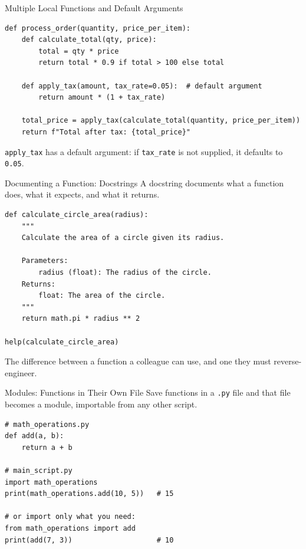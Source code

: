 \documentclass[9pt,aspectratio=169,xcolor=table]{beamer}
\begin{document}
\begin{frame}[fragile]{Multiple Local Functions and Default Arguments}
    \leavevmode
\begin{lstlisting}
def process_order(quantity, price_per_item):
    def calculate_total(qty, price):
        total = qty * price
        return total * 0.9 if total > 100 else total

    def apply_tax(amount, tax_rate=0.05):  # default argument
        return amount * (1 + tax_rate)

    total_price = apply_tax(calculate_total(quantity, price_per_item))
    return f"Total after tax: {total_price}"
\end{lstlisting}

    \vspace{1mm}
    {\small \texttt{apply\_tax} has a \alert{default argument}: if
    \texttt{tax\_rate} is not supplied, it defaults to \texttt{0.05}.}
\end{frame}

\begin{frame}[fragile]{Documenting a Function: Docstrings}
    \leavevmode
    A \alert{docstring} documents what a function does, what it expects,
    and what it returns.

\begin{lstlisting}
def calculate_circle_area(radius):
    """
    Calculate the area of a circle given its radius.

    Parameters:
        radius (float): The radius of the circle.
    Returns:
        float: The area of the circle.
    """
    return math.pi * radius ** 2

help(calculate_circle_area)
\end{lstlisting}

    \vspace{1mm}
    {\small The difference between a function a colleague can use, and
    one they must reverse-engineer.}
\end{frame}

\begin{frame}[fragile]{Modules: Functions in Their Own File}
    \leavevmode
    Save functions in a \texttt{.py} file and that file becomes a
    \alert{module}, importable from any other script.

\begin{lstlisting}
# math_operations.py
def add(a, b):
    return a + b

# main_script.py
import math_operations
print(math_operations.add(10, 5))   # 15

# or import only what you need:
from math_operations import add
print(add(7, 3))                    # 10
\end{lstlisting}
\end{frame}
\end{document}
